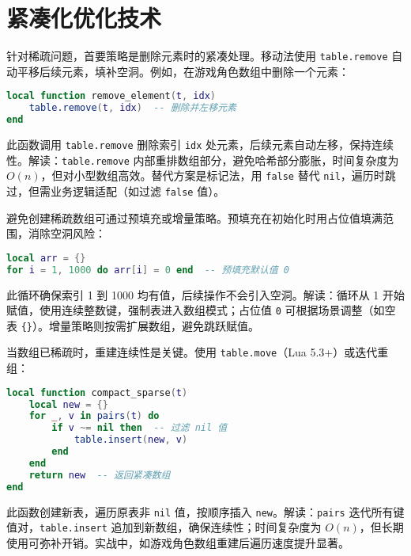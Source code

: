 \chapter{紧凑化优化技术}
针对稀疏问题，首要策略是删除元素时的紧凑处理。移动法使用 \texttt{table.remove} 自动平移后续元素，填补空洞。例如，在游戏角色数组中删除一个元素：\par
\begin{lstlisting}[language=lua]
local function remove_element(t, idx)
    table.remove(t, idx)  -- 删除并左移元素
end
\end{lstlisting}
此函数调用 \texttt{table.remove} 删除索引 \texttt{idx} 处元素，后续元素自动左移，保持连续性。解读：\texttt{table.remove} 内部重排数组部分，避免哈希部分膨胀，时间复杂度为 $O(n)$，但对小型数组高效。替代方案是标记法，用 \texttt{false} 替代 \texttt{nil}，遍历时跳过，但需业务逻辑适配（如过滤 \texttt{false} 值）。\par
避免创建稀疏数组可通过预填充或增量策略。预填充在初始化时用占位值填满范围，消除空洞风险：\par
\begin{lstlisting}[language=lua]
local arr = {}
for i = 1, 1000 do arr[i] = 0 end  -- 预填充默认值 0
\end{lstlisting}
此循环确保索引 1 到 1000 均有值，后续操作不会引入空洞。解读：循环从 1 开始赋值，使用连续整数键，强制表进入数组模式；占位值 \texttt{0} 可根据场景调整（如空表 \texttt{\{{}\}{}}）。增量策略则按需扩展数组，避免跳跃赋值。\par
当数组已稀疏时，重建连续性是关键。使用 \texttt{table.move}（Lua 5.3+）或迭代重组：\par
\begin{lstlisting}[language=lua]
local function compact_sparse(t)
    local new = {}
    for _, v in pairs(t) do
        if v ~= nil then  -- 过滤 nil 值
            table.insert(new, v)
        end
    end
    return new  -- 返回紧凑数组
end
\end{lstlisting}
此函数创建新表，遍历原表非 \texttt{nil} 值，按顺序插入 \texttt{new}。解读：\texttt{pairs} 迭代所有键值对，\texttt{table.insert} 追加到新数组，确保连续性；时间复杂度为 $O(n)$，但长期使用可弥补开销。实战中，如游戏角色数组重建后遍历速度提升显著。\par
